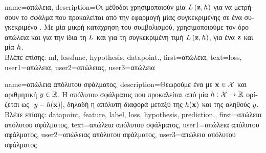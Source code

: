 {name={\foreignlanguage{greek}{απώλεια}}, 
	description={\foreignlanguage{greek}{Οι μέθοδοι}  
		\foreignlanguage{greek}{χρησιμοποιούν μία}  $L\left({\bf z},h \right)$ \foreignlanguage{greek}{για 
		να μετρήσουν το σφάλμα που προκαλείται από την εφαρμογή μίας  
		συγκεκριμένης}  \foreignlanguage{greek}{σε ένα συγκεκριμένο} . \foreignlanguage{greek}{Με 
		μία μικρή κατάχρηση του συμβολισμού, χρησιμοποιούμε τον όρο απώλεια και για την ίδια τη}  $L$ 
		\foreignlanguage{greek}{και για τη συγκεκριμένη τιμή} $L\left({\bf z},h \right)$, \foreignlanguage{greek}{για ένα} 
		 ${\bf z}$ \foreignlanguage{greek}{και μία}  $h$.\\
		\foreignlanguage{greek}{Βλέπε επίσης:} \gls{ml}, \gls{lossfunc}, \gls{hypothesis}, \gls{datapoint}.},
	first={\foreignlanguage{greek}{απώλεια}},
	text={loss},
	user1={\foreignlanguage{greek}{απώλεια}}, %
	user2={\foreignlanguage{greek}{απώλειας}}, %
	user3={\foreignlanguage{greek}{απώλεια}} %
}

{name={\foreignlanguage{greek}{απώλεια απόλυτου σφάλματος}},
	description={\foreignlanguage{greek}{Θεωρούμε ένα}  \foreignlanguage{greek}{με} 
		 ${\bf x} \in \mathcal{X}$ \foreignlanguage{greek}{και αριθμητική} 
		 $y \in \mathbb{R}$. \foreignlanguage{greek}{Η}  
		\foreignlanguage{greek}{απόλυτου σφάλματος που προκαλείται από μία}  $h: \mathcal{X} \rightarrow \mathbb{R}$ 
		\foreignlanguage{greek}{ορίζεται ως $|y - h({\bf x})|$, δηλαδή η απόλυτη διαφορά μεταξύ της} 
		 $h({\bf x})$ \foreignlanguage{greek}{και της αληθούς}  $y$.\\
		\foreignlanguage{greek}{Βλέπε επίσης:} \gls{datapoint}, \gls{feature}, \gls{label}, \gls{loss}, \gls{hypothesis}, \gls{prediction}.},
	first={\foreignlanguage{greek}{απώλεια απόλυτου σφάλματος}},
	text={\foreignlanguage{greek}{απώλεια απόλυτου σφάλματος}},
	user1={\foreignlanguage{greek}{απώλεια απόλυτου σφάλματος}}, %
	user2={\foreignlanguage{greek}{απώλειας απόλυτου σφάλματος}}, %
	user3={\foreignlanguage{greek}{απώλεια απόλυτου σφάλματος}} %
}

